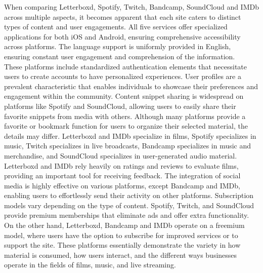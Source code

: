 When comparing Letterboxd, Spotify, Twitch, Bandcamp, SoundCloud and IMDb across multiple aspects, it becomes apparent that each site caters to distinct types of content and user engagements. All five services offer specialized applications for both iOS and Android, ensuring comprehensive accessibility across platforms. The language support is uniformly provided in English, ensuring constant user engagement and comprehension of the information. \\

These platforms include standardized authentication elements that necessitate users to create accounts to have personalized experiences. User profiles are a prevalent characteristic that enables individuals to showcase their preferences and engagement within the community. Content snippet sharing is widespread on platforms like Spotify and SoundCloud, allowing users to easily share their favorite snippets from media with others. Although many platforms provide a favorite or bookmark function for users to organize their selected material, the details may differ. Letterboxd and IMDb specialize in films, Spotify specializes in music, Twitch specializes in live broadcasts, Bandcamp specializes in music and merchandise, and SoundCloud specializes in user-generated audio material. \\

Letterboxd and IMDb rely heavily on ratings and reviews to evaluate films, providing an important tool for receiving feedback. The integration of social media is highly effective on various platforms, except Bandcamp and IMDb, enabling users to effortlessly send their activity on other platforms. Subscription models vary depending on the type of content. Spotify, Twitch, and SoundCloud provide premium memberships that eliminate ads and offer extra functionality. On the other hand, Letterboxd, Bandcamp and IMDb operate on a freemium model, where users have the option to subscribe for improved services or to support the site. These platforms essentially demonstrate the variety in how material is consumed, how users interact, and the different ways businesses operate in the fields of films, music, and live streaming.